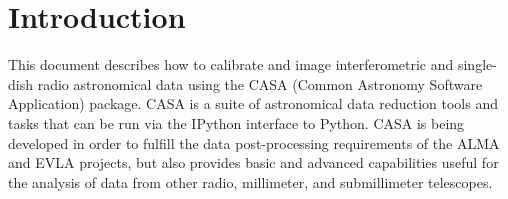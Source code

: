 

\chapter{Introduction}
\label{chapter:intro}


This document describes how to calibrate and image interferometric and
single-dish radio astronomical data using the CASA (Common Astronomy
Software Application) package.  CASA is a suite of
astronomical data reduction tools and tasks that can be run via the
IPython interface to Python.  CASA is being developed in order to 
fulfill the data post-processing requirements of the ALMA and EVLA
projects, but also provides basic and advanced capabilities useful for
the analysis of data from other radio, millimeter, and submillimeter
telescopes.

